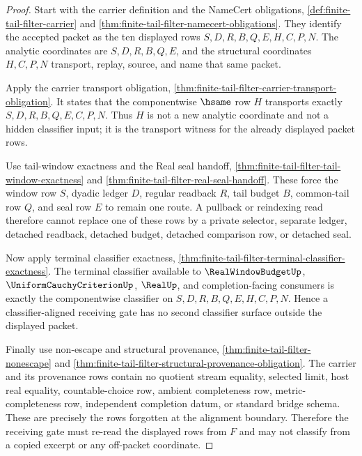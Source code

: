 \begin{proof}
Start with the carrier definition and the NameCert obligations, \autoref{def:finite-tail-filter-carrier} and \autoref{thm:finite-tail-filter-namecert-obligations}. They identify the accepted packet as the ten displayed rows $S,D,R,B,Q,E,H,C,P,N$. The analytic coordinates are $S,D,R,B,Q,E$, and the structural coordinates $H,C,P,N$ transport, replay, source, and name that same packet.

Apply the carrier transport obligation, \autoref{thm:finite-tail-filter-carrier-transport-obligation}. It states that the componentwise $\hsame$ row $H$ transports exactly $S,D,R,B,Q,E,C,P,N$. Thus $H$ is not a new analytic coordinate and not a hidden classifier input; it is the transport witness for the already displayed packet rows.

Use tail-window exactness and the Real seal handoff, \autoref{thm:finite-tail-filter-tail-window-exactness} and \autoref{thm:finite-tail-filter-real-seal-handoff}. These force the window row $S$, dyadic ledger $D$, regular readback $R$, tail budget $B$, common-tail row $Q$, and seal row $E$ to remain one route. A pullback or reindexing read therefore cannot replace one of these rows by a private selector, separate ledger, detached readback, detached budget, detached comparison row, or detached seal.

Now apply terminal classifier exactness, \autoref{thm:finite-tail-filter-terminal-classifier-exactness}. The terminal classifier available to $\RealWindowBudgetUp$, $\UniformCauchyCriterionUp$, $\RealUp$, and completion-facing consumers is exactly the componentwise classifier on $S,D,R,B,Q,E,H,C,P,N$. Hence a classifier-aligned receiving gate has no second classifier surface outside the displayed packet.

Finally use non-escape and structural provenance, \autoref{thm:finite-tail-filter-nonescape} and \autoref{thm:finite-tail-filter-structural-provenance-obligation}. The carrier and its provenance rows contain no quotient stream equality, selected limit, host real equality, countable-choice row, ambient completeness row, metric-completeness row, independent completion datum, or standard bridge schema. These are precisely the rows forgotten at the alignment boundary. Therefore the receiving gate must re-read the displayed rows from $F$ and may not classify from a copied excerpt or any off-packet coordinate.
\end{proof}


